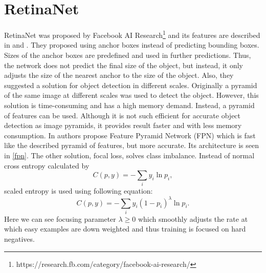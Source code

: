 \documentclass[twoside]{ctuthesis}
\theoremstyle{plain}
\theoremstyle{definition}
\theoremstyle{note}
\begin{document}
\section{RetinaNet}

RetinaNet was proposed by Facebook AI Research\footnote{https://research.fb.com/category/facebook-ai-research/} and its features are described in \cite{lin_dollar_girshick_he_hariharan_belongie_2017} and \cite{lin_goyal_girshick_he_dollar_2017}. 
They proposed using anchor boxes instead of predicting bounding boxes. Sizes of the anchor boxes are predefined and used in further predictions. Thus, the network does not predict the final size of the object, but instead, it only adjusts the size of the nearest anchor to the size of the object. 
Also, they suggested a solution for object detection in different scales. Originally a pyramid of the same image at different scales was used to detect the object. However, this solution is time-consuming and has a high memory demand. Instead, a pyramid of features can be used. Although it is not such efficient for accurate object detection as image pyramids, it provides result faster and with less memory consumption. In \cite{lin_dollar_girshick_he_hariharan_belongie_2017} authors propose Feature Pyramid Network (FPN) which is fast like the described pyramid of features, but more accurate. Its architecture is seen in \ref{fpn}.
The other solution, focal loss, solves class imbalance. Instead of normal cross entropy calculated by 
\begin{equation}
C(p, y) = -\sum_{i}y_i \ln p_i,
\end{equation}  
scaled entropy is used using following equation:
\begin{equation}
C(p,y)=-\sum_i y_i(1-p_i)^{\lambda}\ln p_i.
\end{equation}
Here we can see focusing parameter $\lambda \geq 0$ which smoothly adjusts the rate at which easy examples are down weighted and thus training is focused on hard negatives. 
\end{document}
